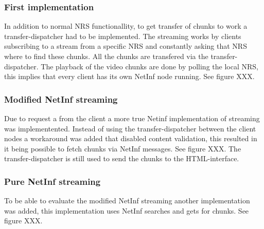 \subsubsection{First implementation}
In addition to normal NRS functionallity, to get transfer of chunks to work a transfer-dispatcher had to be implemented. The streaming works by clients subscribing to a stream from a specific NRS and constantly asking that NRS where to find these chunks. All the chunks are transfered via the transfer-dispatcher.
The playback of the video chunks are done by polling the local NRS, this implies that every client has its own NetInf node running. See figure XXX.

\subsubsection{Modified NetInf streaming}
Due to request a from the client a more true Netinf implementation of streaming was implementented. Instead of using the transfer-dispatcher between the client nodes a workaround was added that disabled content validation, this resulted in it being possible to fetch chunks via NetInf messages. See figure XXX. The transfer-dispatcher is still used to send the chunks to the HTML-interface.

\subsubsection{Pure NetInf streaming}
To be able to evaluate the modified NetInf streaming another implementation was added, this implementation uses NetInf searches and gets for chunks. See figure XXX.

